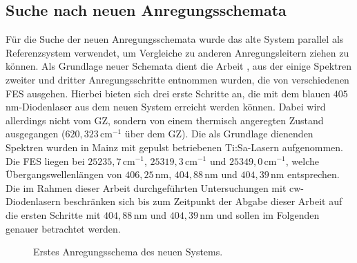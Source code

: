 \subsection{Suche nach neuen Anregungsschemata}\label{subsec:schema_suche}
Für die Suche der neuen Anregungsschemata wurde das alte System parallel als
Referenzsystem verwendet, um Vergleiche zu anderen Anregungsleitern ziehen
zu können. Als Grundlage neuer Schemata dient die Arbeit
\cite{raeder:2011:dissertation}, aus der einige Spektren zweiter und dritter
Anregungsschritte entnommen wurden, die von verschiedenen FES ausgehen. Hierbei
bieten sich drei erste Schritte an, die mit dem blauen $405\,$nm-Diodenlaser aus dem neuen System erreicht werden können. Dabei wird allerdings nicht vom GZ, sondern von einem thermisch angeregten
Zustand ausgegangen ($620,323\,$cm$^{-1}$ über dem GZ). Die als
Grundlage dienenden Spektren wurden in Mainz mit gepulst betriebenen
Ti:Sa-Lasern aufgenommen. Die FES liegen bei $25235,7\,$cm$^{-1}$,
$25319,3\,$cm$^{-1}$ und $25349,0\,$cm$^{-1}$, welche Übergangswellenlängen von $406,25\,$nm, $404,88\,$nm und $404,39\,$nm
entsprechen. Die im Rahmen dieser Arbeit durchgeführten Untersuchungen mit
cw-Diodenlasern beschränken sich bis zum Zeitpunkt der Abgabe dieser Arbeit auf
die ersten Schritte mit $404,88\,$nm und $404,39\,$nm und sollen im Folgenden genauer
betrachtet werden.\par
\begin{figure}[h]
 	\centering
	\caption[Anregungsschema, neu (1)]{Erstes Anregungsschema des neuen
	Systems.}
	\label{fig:anregungsschema_neu_01}
\end{figure}
